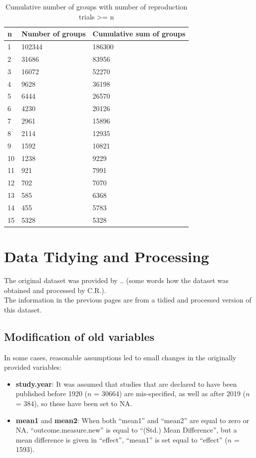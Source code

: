 \documentclass[11pt,a4paper,twoside]{book}\usepackage[]{graphicx}\usepackage[]{color}
\begin{document}
\begin{table}[ht]
\centering
\begingroup\footnotesize
\begin{tabular}{lll}
  \hline
n & Number of groups & Cumulative sum of groups \\ 
  \hline
1 & 102344 & 186300 \\ 
  2 & 31686 & 83956 \\ 
  3 & 16072 & 52270 \\ 
  4 & 9628 & 36198 \\ 
  5 & 6444 & 26570 \\ 
  6 & 4230 & 20126 \\ 
  7 & 2961 & 15896 \\ 
  8 & 2114 & 12935 \\ 
  9 & 1592 & 10821 \\ 
  10 & 1238 & 9229 \\ 
  11 & 921 & 7991 \\ 
  12 & 702 & 7070 \\ 
  13 & 585 & 6368 \\ 
  14 & 455 & 5783 \\ 
  15 & 5328 & 5328 \\ 
   \hline
\end{tabular}
\endgroup
\caption{Cumulative number of groups with number of reproduction trials >= n} 
\label{repr.groups}
\end{table}


\section{Data Tidying and Processing} \label{sec:Processing}
The original dataset was provided by .. (some words how the dataset was obtained and processed by C.R.). \\
The information in the previous pages are from a tidied and processed version of this dataset. \\

\subsection{Modification of old variables}
In some cases, reasonable assumptions led to small changes in the originally provided variables:
\begin{itemize}
\item \textbf{study.year}: It was assumed that studies that are declared to have been published before 1920 ($n$ = 30664) are mis-specified, as well as after 2019 ($n$ = 384), so these have been set to NA. 
\item \textbf{mean1} and \textbf{mean2}: When both ``mean1'' and ``mean2'' are equal to zero or NA, ``outcome.measure.new'' is equal to ``(Std.) Mean Difference'', but a mean difference is given in ``effect'', ``mean1'' is set equal to ``effect'' ($n$ = 1593).
\end{itemize}
\end{document}
